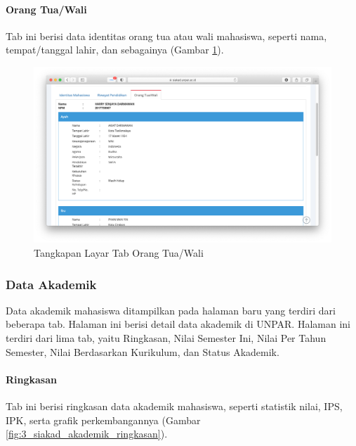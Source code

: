\paragraph{Orang Tua/Wali} Tab ini berisi data identitas orang tua atau wali mahasiswa, seperti nama, tempat/tanggal lahir, dan sebagainya (Gambar \ref{fig:3_siakad_datadiri_orangtuawali}).

\begin{figure}[H]
    \centering
    \includegraphics[scale=0.3]{Gambar/siakad_datadiri_orangtuawali.png}
    \caption{Tangkapan Layar Tab Orang Tua/Wali}
    \label{fig:3_siakad_datadiri_orangtuawali}
\end{figure}

\subsubsection{Data Akademik}

Data akademik mahasiswa ditampilkan pada halaman baru yang terdiri dari beberapa tab. Halaman ini berisi detail data akademik di UNPAR. Halaman ini terdiri dari lima tab, yaitu Ringkasan, Nilai Semester Ini, Nilai Per Tahun Semester, Nilai Berdasarkan Kurikulum, dan Status Akademik.

\paragraph{Ringkasan} Tab ini berisi ringkasan data akademik mahasiswa, seperti statistik nilai, IPS, IPK, serta grafik perkembangannya (Gambar \ref{fig:3_siakad_akademik_ringkasan}).

